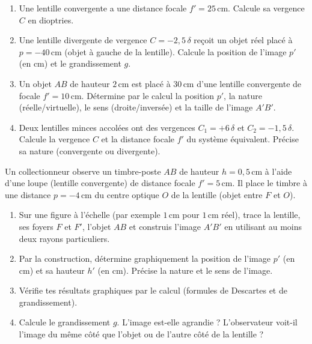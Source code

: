 \documentclass[11pt]{article}
\newcounter{popsec}
\newcounter{popsub}
\newcommand{\courssub}[1]{%
  \stepcounter{popsub}%
  \par\vspace{9pt}\noindent{\popxbold\fontsize{11.5}{13}\selectfont\color{popink}{\color{poporange}\thepopsec.\thepopsub}\hspace{6pt}#1}\par\nopagebreak\vspace{4pt}
}
\begin{document}
\begin{exercice}
\begin{enumerate}
    \item Une lentille convergente a une distance focale $f' = 25\,\text{cm}$. Calcule sa vergence $C$ en dioptries.
    \item Une lentille divergente de vergence $C = -2,5\,\delta$ reçoit un objet réel placé à $p = -40\,\text{cm}$ (objet à gauche de la lentille). Calcule la position de l'image $p'$ (en cm) et le grandissement $g$.
    \item Un objet $AB$ de hauteur $2\,\text{cm}$ est placé à $30\,\text{cm}$ d'une lentille convergente de focale $f' = 10\,\text{cm}$. Détermine par le calcul la position $p'$, la nature (réelle/virtuelle), le sens (droite/inversée) et la taille de l'image $A'B'$.
    \item Deux lentilles minces accolées ont des vergences $C_1 = +6\,\delta$ et $C_2 = -1,5\,\delta$. Calcule la vergence $C$ et la distance focale $f'$ du système équivalent. Précise sa nature (convergente ou divergente).
\end{enumerate}
\end{exercice}

\courssub{Je m'entraîne}

\begin{exercice}
Un collectionneur observe un timbre-poste $AB$ de hauteur $h = 0,5\,\text{cm}$ à l'aide d'une loupe (lentille convergente) de distance focale $f' = 5\,\text{cm}$. Il place le timbre à une distance $p = -4\,\text{cm}$ du centre optique $O$ de la lentille (objet entre $F$ et $O$).
\begin{enumerate}
    \item Sur une figure à l'échelle (par exemple $1\,\text{cm}$ pour $1\,\text{cm}$ réel), trace la lentille, ses foyers $F$ et $F'$, l'objet $AB$ et construis l'image $A'B'$ en utilisant au moins deux rayons particuliers.
    \item Par la construction, détermine graphiquement la position de l'image $p'$ (en cm) et sa hauteur $h'$ (en cm). Précise la nature et le sens de l'image.
    \item Vérifie tes résultats graphiques par le calcul (formules de Descartes et de grandissement).
    \item Calcule le grandissement $g$. L'image est-elle agrandie ? L'observateur voit-il l'image du même côté que l'objet ou de l'autre côté de la lentille ?
\end{enumerate}
\end{exercice}
\end{document}

